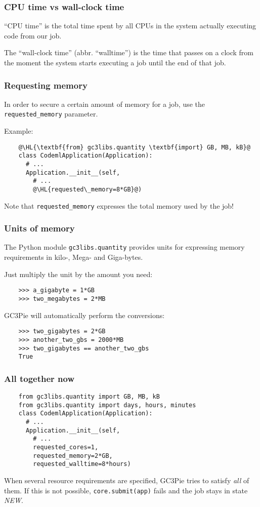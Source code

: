 \documentclass[english,serif,mathserif,xcolor=pdftex,dvipsnames,table]{beamer}
\begin{document}
\begin{frame}
  \frametitle{CPU time vs wall-clock time}

  ``CPU time'' is the total time spent by all CPUs in the system
  actually executing code from our job.

  \+
  The ``wall-clock time'' (abbr. ``walltime'') is the time that
  passes on a clock from the moment the system starts executing a job
  until the end of that job.
\end{frame}


\begin{frame}[fragile]
  \frametitle{Requesting memory}
  In order to secure a certain amount of memory for a job, use the
  \lstinline|requested_memory| parameter.

  \+
  Example:
  \begin{lstlisting}
    @\HL{\textbf{from} gc3libs.quantity \textbf{import} GB, MB, kB}@
    class CodemlApplication(Application):
      # ...
      Application.__init__(self,
        # ...
        @\HL{requested\_memory=8*GB}@)
  \end{lstlisting}

  \+
  Note that \lstinline|requested_memory| expresses the total
  memory used by the job!
\end{frame}

\begin{frame}[fragile]
  \frametitle{Units of memory}
  The Python module \texttt{gc3libs.quantity} provides units for
  expressing memory requirements in kilo-, Mega- and Giga-bytes.

  \+
  Just multiply the unit by the amount you need:
  \begin{lstlisting}
    >>> a_gigabyte = 1*GB
    >>> two_megabytes = 2*MB
  \end{lstlisting}

  \+
  GC3Pie will automatically perform the conversions:
  \begin{lstlisting}
    >>> two_gigabytes = 2*GB
    >>> another_two_gbs = 2000*MB
    >>> two_gigabytes == another_two_gbs
    True
  \end{lstlisting}
\end{frame}


\begin{frame}[fragile]
  \frametitle{All together now}

  \begin{lstlisting}
    from gc3libs.quantity import GB, MB, kB
    from gc3libs.quantity import days, hours, minutes
    class CodemlApplication(Application):
      # ...
      Application.__init__(self,
        # ...
        requested_cores=1,
        requested_memory=2*GB,
        requested_walltime=8*hours)
  \end{lstlisting}

  \+
  When several resource requirements are specified, GC3Pie tries to
  satisfy \emph{all} of them.  If this is not possible,
  \lstinline|core.submit(app)| fails and the job stays in state
  \emph{NEW}.

\end{frame}
\end{document}
